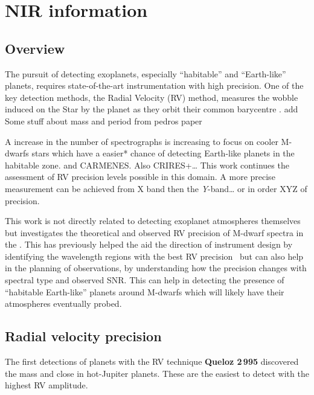 
\chapter{NIR information}

\label{cha:nir_content}

\section{Overview}

The pursuit of detecting exoplanets, especially ``habitable'' and ``Earth-like'' planets, requires state-of-the-art instrumentation with high precision. One of the key detection methods, the Radial Velocity ({RV}) method, measures the wobble induced on the Star by the planet as they orbit their common barycentre .  {\red{} add Some stuff about mass and period from pedros paper}



A increase in the number of \nir{} spectrographs is increasing to focus on cooler M-dwarfs stars which have a easier* chance of detecting Earth-like planets in the habitable zone.  and {CARMENES}. Also {CRIRES+}\ldots{}
This work continues the assessment of {RV} precision levels possible in this domain.
 A more precise measurement can be achieved from X band then the \emph{Y}-band\ldots{} or in order XYZ of precision.




This work is not directly related to detecting exoplanet atmospheres themselves but investigates the theoretical and observed {RV} precision of M-dwarf spectra in the \nir{}. This has previously helped the aid the direction of instrument design by identifying the wavelength regions with the best {RV} precision~\citep{figueira_radial_2016} but can also help in the planning of observations, by understanding how the precision changes with spectral type and observed {SNR}. This can help in detecting the presence of ``habitable Earth-like'' planets around M-dwarfs which will likely have their atmospheres eventually probed.


\section{Radial velocity precision}
The first detections of planets with the {RV} technique \textbf{Queloz 2\,995} discovered the mass and close in hot-Jupiter planets. These are the easiest to detect with the highest {RV} amplitude.

